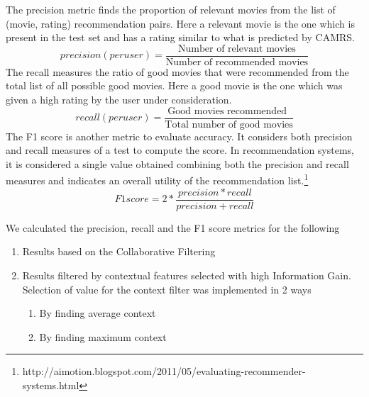 \documentclass{article}
\begin{document}
The precision metric finds the proportion of relevant movies from the list of (movie, rating) recommendation pairs. Here a relevant movie   is the one which is present in the test set and has a rating similar to what is predicted by CAMRS.
\begin{equation}
precision (per user) = \frac{\text{Number of relevant movies}} {\text{Number of recommended movies}}
\end{equation} 
The recall measures the ratio of good movies that were recommended from the total list of all possible good movies. Here a good movie is the one which was given a high rating by the user under consideration.
\begin{equation}
recall (per user) = \frac{\text{Good movies recommended }}{\text{Total number of good movies}}
\end{equation}
 The F1 score is another metric to evaluate accuracy.  It considers both precision and recall measures of a test to compute the score. In recommendation systems, it is considered a single value obtained combining both the precision and recall measures and indicates an overall utility of the recommendation list.\footnote{http://aimotion.blogspot.com/2011/05/evaluating-recommender-systems.html}
\begin{equation}
F1 score = 2 * \frac{precision * recall}{precision + recall}
\end{equation}

 We calculated the precision, recall and the F1 score metrics for the following 
\begin{enumerate} 
\item Results based on the Collaborative Filtering
\item Results filtered by contextual features selected with high Information Gain. Selection of value for the context filter was implemented in 2 ways
\begin{enumerate}
\item By finding average context 
\item By finding maximum context
\end{enumerate}
\end{enumerate}
\end{document}

